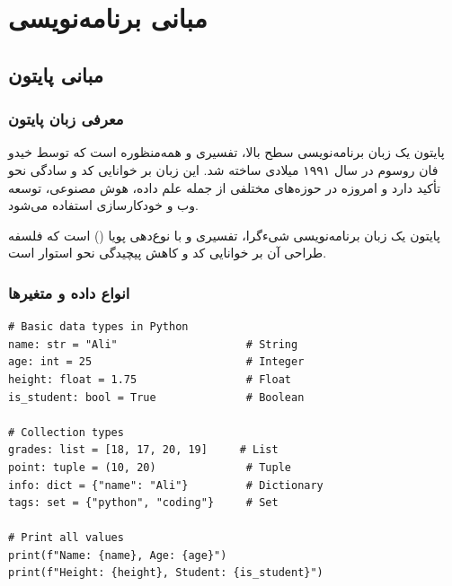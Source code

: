 \documentclass{matinbook}
\begin{document}
\listoffigures
\clearpage

\listoftables
\clearpage

\listofalgorithms
\clearpage
\mainmatter

\part{مبانی برنامه‌نویسی}

\chapter{مبانی پایتون}
\label{chap:python}

\section{معرفی زبان پایتون}

پایتون یک زبان برنامه‌نویسی
سطح بالا، تفسیری و همه‌منظوره است که توسط
خیدو فان روسوم
در سال ۱۹۹۱ میلادی ساخته شد. این زبان
بر خوانایی کد و سادگی نحو تأکید دارد
و امروزه در حوزه‌های مختلفی از جمله
علم داده،
هوش مصنوعی،
توسعه وب و
خودکارسازی استفاده می‌شود.

\begin{definition}[پایتون]
    پایتون یک زبان برنامه‌نویسی شیءگرا،
    تفسیری و با نوع‌دهی پویا ()
    است که فلسفه طراحی آن بر خوانایی کد
    و کاهش پیچیدگی نحو استوار است.
    \label{def:python}
\end{definition}

\section{انواع داده و متغیرها}

\begin{latin}
\begin{verbatim}
# Basic data types in Python
name: str = "Ali"                    # String
age: int = 25                        # Integer
height: float = 1.75                 # Float
is_student: bool = True              # Boolean

# Collection types
grades: list = [18, 17, 20, 19]     # List
point: tuple = (10, 20)              # Tuple
info: dict = {"name": "Ali"}         # Dictionary
tags: set = {"python", "coding"}     # Set

# Print all values
print(f"Name: {name}, Age: {age}")
print(f"Height: {height}, Student: {is_student}")
\end{verbatim}
\end{latin}
\label{code:data-types}
\end{document}

